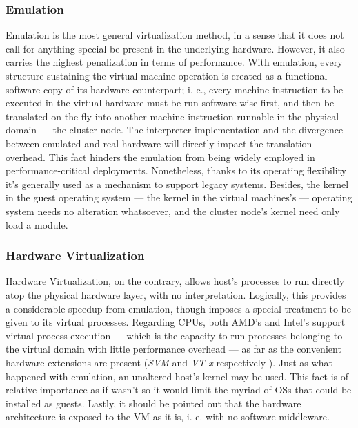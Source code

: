 \subsubsection{Emulation}\label{subsubsec:emulacion}

\noindent Emulation is the most general virtualization method, in a sense that it does not call for anything special be present in the underlying hardware. However, it also carries the highest penalization in terms of performance. With emulation, every structure sustaining the virtual machine operation is created as a functional software copy of its hardware counterpart; i. e., every machine instruction to be executed in the virtual hardware must be run software-wise first, and then be translated on the fly into another machine instruction runnable in the physical domain --- the cluster node. The interpreter implementation and the divergence between emulated and real hardware will directly impact the translation overhead. This fact hinders the emulation from being widely employed in performance-critical deployments. Nonetheless, thanks to its operating flexibility it's generally used as a mechanism to support legacy systems. Besides, the kernel in the guest operating system --- the kernel in the virtual machines's --- operating system needs no alteration whatsoever, and the cluster node's kernel need only load a module.

\subsubsection{Hardware Virtualization}\label{subsubsec:virthardware}

\noindent Hardware Virtualization, on the contrary, allows host's processes to run directly atop the physical hardware layer, with no interpretation. Logically, this provides a considerable speedup from emulation, though imposes a special treatment to be given to its virtual processes. Regarding CPUs, both AMD's and Intel's support virtual process execution --- which is the capacity to run processes belonging to the virtual domain with little performance overhead --- as far as the convenient hardware extensions are present (\emph{SVM} and \emph{VT-x} respectively \cite{intelvtx}). Just as what happened with emulation, an unaltered host's kernel may be used. This fact is of relative importance as if wasn't so it would limit the myriad of OSs that could be installed as guests. Lastly, it should be pointed out that the hardware architecture is exposed to the VM as it is, i. e. with no software middleware.

